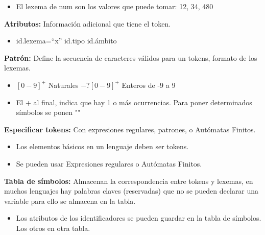 \documentclass[12pt]{report} %
\begin{document}
\begin{itemize}

\item
  El lexema de num son los valores que puede tomar: 12, 34, 480
\end{itemize}

\textbf{Atributos:} Información adicional que tiene el token.

\begin{itemize}

\item
  id.lexema=``x'' id.tipo id.ámbito
\end{itemize}

\textbf{Patrón:} Define la secuencia de caracteres válidos para un
tokens, formato de los lexemas.

\begin{itemize}
\item
  \([0-9]^+\) Naturales \(-?[0-9]^+\) Enteros de -9 a 9
\item
  El + al final, indica que hay 1 o más ocurrencias. Para poner
  determinados símbolos se ponen ""
\end{itemize}

\textbf{Especificar tokens:} Con expresiones regulares, patrones, o
Autómatas Finitos.

\begin{itemize}
\item
  Los elementos básicos en un lenguaje deben ser tokens.
\item
  Se pueden usar Expresiones regulares o Autómatas Finitos.
\end{itemize}

\textbf{Tabla de símbolos:} Almacenan la correspondencia entre tokens y
lexemas, en muchos lenguajes hay palabras claves (reservadas) que no se
pueden declarar una variable para ello se almacena en la tabla.

\begin{itemize}

\item
  Los atributos de los identificadores se pueden guardar en la tabla de
  símbolos. Los otros en otra tabla.
\end{itemize}
\end{document}
